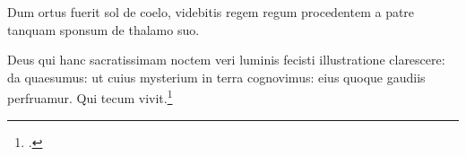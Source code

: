 


Dum ortus fuerit sol de coelo, videbitis regem regum
procedentem a patre tanquam sponsum de thalamo suo.

Deus qui hanc sacratissimam noctem veri luminis fecisti
illustratione clarescere:
da quaesumus: ut cuius mysterium in terra cognovimus:
eius quoque gaudiis perfruamur.
Qui tecum vivit.\footcite[98r]{bp1502}

\headingCantus

